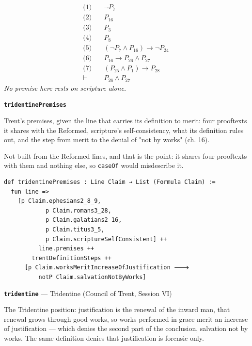 \documentclass[11pt]{article}
\begin{document}
\begin{align*}
  \text{(1)} \quad & \lnot P_{7} \\
  \text{(2)} \quad & P_{16} \\
  \text{(3)} \quad & P_{3} \\
  \text{(4)} \quad & P_{8} \\
  \text{(5)} \quad & (\lnot P_{7} \land P_{16}) \rightarrow \lnot P_{24} \\
  \text{(6)} \quad & P_{16} \rightarrow P_{26} \land P_{27} \\
  \text{(7)} \quad & (P_{25} \land P_{1}) \rightarrow P_{28} \\
  \vdash \quad & P_{26} \land P_{27}
\end{align*}
\emph{No premise here rests on scripture alone.}
\par\medskip\noindent\textbf{\texttt{tridentine\allowbreak{}Premises}}\par\nobreak\noindent
Trent's premises, given the line that carries its definition to merit: four prooftexts it shares with the Reformed, scripture's self-consistency, what its definition rules out, and the step from merit to the denial of "not by works" (ch. 16).

Not built from the Reformed lines, and that is the point: it shares four prooftexts with them and nothing else, so \texttt{case\allowbreak{}Of} would misdescribe it.

{\small\begin{verbatim}
def tridentinePremises : Line Claim → List (Formula Claim) :=
  fun line =>
    [p Claim.ephesians2_8_9,
            p Claim.romans3_28,
            p Claim.galatians2_16,
            p Claim.titus3_5,
            p Claim.scriptureSelfConsistent] ++
          line.premises ++
        trentDefinitionSteps ++
      [p Claim.worksMeritIncreaseOfJustification 🡒
          notP Claim.salvationNotByWorks]
\end{verbatim}}
\par\medskip\noindent\textbf{\texttt{tridentine}} --- Tridentine (Council of Trent, Session VI)\par\nobreak\noindent
The Tridentine position: justification is the renewal of the inward man, that renewal grows through good works, so works performed in grace merit an increase of justification — which denies the second part of the conclusion, salvation not by works. The same definition denies that justification is forensic only.
\end{document}
